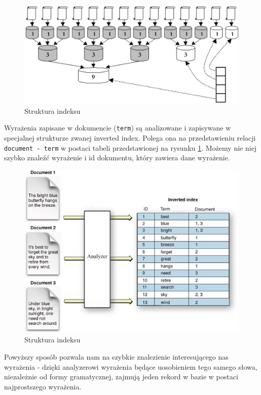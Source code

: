 \documentclass[licencjacka]{pracadypl}
\theoremstyle{definition}
\begin{document}
\begin{figure}[H]
	\centering
	\includegraphics[width=1\linewidth]{img/segments.png}
	\caption{Struktura indeksu \cite{alg-on-cloud}}
\end{figure}

Wyrażenia zapisane w dokumencie (\texttt{term}) są analizowane i zapisywane w specjalnej strukturze zwanej inverted index. Polega ona na przedstawieniu relacji \texttt{document - term} w postaci tabeli przedstawionej na rysunku \ref{inverted-index}. Możemy nie niej szybko znaleźć wyrażenie i id dokumentu, który zawiera dane wyrażenie.

\begin{figure}[H]
	\centering
	\includegraphics[width=1\linewidth]{img/inverted-index.jpg}
	\caption{Struktura indeksu}
	\label{inverted-index}
\end{figure}

Powyższy sposób pozwala nam na szybkie znalezienie interesującego nas wyrażenia - dzięki analyzerowi wyrażenia będące uosobieniem tego samego słowa, niezależnie od formy gramatycznej, zajmują jeden rekord w bazie w postaci najprostszego wyrażenia.
\end{document}

